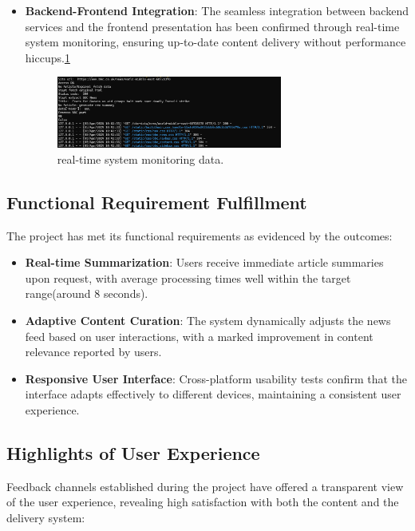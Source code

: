 \documentclass[10pt]{article}
\begin{document}
\begin{itemize}
    \item \textbf{Backend-Frontend Integration}: The seamless integration between backend services and the frontend presentation has been confirmed through real-time system monitoring, ensuring up-to-date content delivery without performance hiccups.\ref{fig:integration}
    
    \begin{figure}[H]
        \centering
        \includegraphics[width=0.7\textwidth]{../integration.png}
        \caption{real-time system monitoring data.}
        \label{fig:integration}
    \end{figure}

\end{itemize}

\subsection{Functional Requirement Fulfillment}

The project has met its functional requirements as evidenced by the outcomes:

\begin{itemize}
    \item \textbf{Real-time Summarization}: Users receive immediate article summaries upon request, with average processing times well within the target range(around 8 seconds).
    \item \textbf{Adaptive Content Curation}: The system dynamically adjusts the news feed based on user interactions, with a marked improvement in content relevance reported by users.
    \item \textbf{Responsive User Interface}: Cross-platform usability tests confirm that the interface adapts effectively to different devices, maintaining a consistent user experience.
\end{itemize}

\subsection{Highlights of User Experience}

Feedback channels established during the project have offered a transparent view of the user experience, revealing high satisfaction with both the content and the delivery system:
\end{document}
